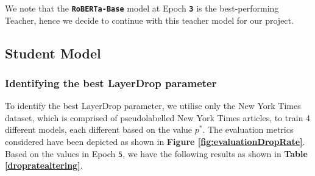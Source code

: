 \documentclass[12pt]{article}
\begin{document}
{We note that the \textbf{\texttt{RoBERTa-Base}} model at Epoch \textbf{\texttt{3}} is the best-performing Teacher, hence we decide to continue with this teacher model for our project.


\subsection{Student Model}

\subsubsection{Identifying the best LayerDrop parameter}

To identify the best LayerDrop parameter, we utilise only the New York Times dataset, which is comprised of pseudolabelled New York Times articles, to train 4 different models, each different based on the value $p^*$. The evaluation metrics considered have been depicted as shown in \textbf{Figure \ref{fig:evaluationDropRate}}. Based on the values in Epoch \texttt{5}, we have the following results as shown in \textbf{Table \ref{dropratealtering}}.

}
\end{document}
